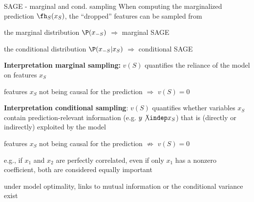 \documentclass[10pt,compress,t,notes=noshow, xcolor=table]{beamer}
\begin{document}
\begin{framev}[align=top]{SAGE - marginal and cond. sampling}
When computing the marginalized prediction $\fh_S(x_S)$, the ``dropped'' features can be sampled from \\
\begin{itemizeM}
\item the marginal distribution $\P(x_{-S})$ $\Rightarrow$ marginal SAGE
\item the conditional distribution $\P(x_{-S}|x_S)$ $\Rightarrow$ conditional SAGE
\end{itemizeM}
\spacer[0.25]
\pause
\textbf{Interpretation marginal sampling:} $v(S)$ quantifies the reliance of the model on features $x_S$
\begin{itemizeM}
\item features $x_S$ not being causal for the prediction $\Rightarrow$ $v(S) = 0$
\end{itemizeM}
\spacer[0.25]
\pause
\textbf{Interpretation conditional sampling}: $v(S)$ quantifies whether variables $x_S$ contain prediction-relevant information (e.g. $y \not \indep x_S$) that is (directly or indirectly) exploited by the model
\begin{itemizeM}
\item features $x_S$ not being causal for the prediction $\not \Rightarrow$ $v(S) = 0$
\begin{itemizeS}
\item e.g., if $x_1$ and $x_2$ are perfectly correlated, even if only $x_1$ has a nonzero coefficient, both are considered equally important
\end{itemizeS}
\item under model optimality, links to mutual information or the conditional variance exist
\end{itemizeM}
\end{framev}
\end{document}
